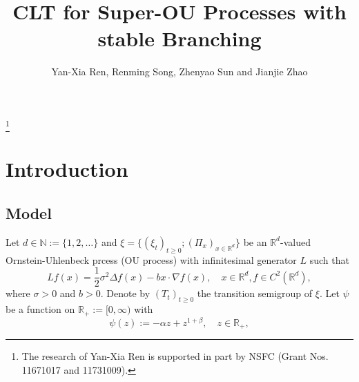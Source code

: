 \documentclass[12pt,oneside,english]{amsart}
\theoremstyle{plain}
\theoremstyle{definition}
\numberwithin{equation}{section}
\begin{document}
\title
    [CLT for Super-OU processes]
    {CLT for Super-OU Processes with stable Branching}
\author
    [Y.-X. Ren, R. Song, Z. Sun and J. Zhao]
    {Yan-Xia Ren, Renming Song, Zhenyao Sun and Jianjie Zhao}
\address
    {Yan-Xia Ren\\
    School of Mathematical Sciences\\
    Peking University\\
    Beijing, P. R. China, 100871}
\thanks{The research of Yan-Xia Ren is supported in part by NSFC (Grant Nos. 11671017  and 11731009).}
\address
    {Zhenyao Sun\\
    School of Mathematical Sciences\\
    Peking University\\
    Beijing, P. R. China, 100871}
\address
    {Jianjie Zhao\\
    School of Mathematical Sciences\\
    Peking University\\
    Beijing, P. R. China, 100871}
\maketitle
\section{Introduction}
\subsection{Model}
    Let $d \in \mathbb N:= \{1,2,\dots\}$ and
    $\xi=\{(\xi_t)_{t\geq 0}; (\Pi_x)_{x\in \mathbb R^d}\}$ be an $\mathbb R^d$-valued Ornstein-Uhlenbeck prcess (OU process) with infinitesimal generator $L$ such that
\begin{equation}
\label{eq: OU generator}
    Lf(x)
        = \frac{1}{2}\sigma^2\Delta f(x)-b x \cdot \nabla f(x),
        \quad  x\in \mathbb R^d,
        f \in C^2(\mathbb{R}^d),
\end{equation}
    where $\sigma>0$ and $b>0$.
    Denote by $(T_t)_{t\geq 0}$ the transition semigroup of $\xi$.
    Let $\psi$ be a function on $\mathbb R_+:= [0,\infty)$ with
\begin{equation}\label{mechanism}
    \psi(z)
    := - \alpha z + z^{1+\beta},
    \quad z \in \mathbb R_+,
\end{equation}
\end{document}
